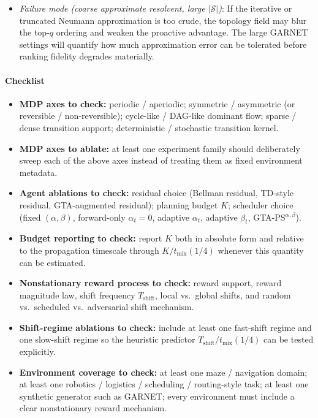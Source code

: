 \documentclass[10pt,a4paper]{article}
\begin{document}
\begin{itemize}
  \item \textit{Failure mode (coarse approximate resolvent, large $|\mathcal{S}|$)}: If the
    iterative or truncated Neumann approximation is too crude, the topology field may blur the
    top-$q$ ordering and weaken the proactive advantage. The large GARNET settings will quantify
    how much approximation error can be tolerated before ranking fidelity degrades materially.
\end{itemize}


\paragraph{Checklist}
\begin{itemize}\setlength\itemsep{2pt}
  \item \textbf{MDP axes to check:} periodic / aperiodic; symmetric / asymmetric (or reversible / non-reversible); cycle-like / DAG-like dominant flow; sparse / dense transition support; deterministic / stochastic transition kernel.

  \item \textbf{MDP axes to ablate:} at least one experiment family should deliberately sweep each of the above axes instead of treating them as fixed environment metadata.

  \item \textbf{Agent ablations to check:} residual choice (Bellman residual, TD-style residual, GTA-augmented residual); planning budget $K$; scheduler choice (fixed $(\alpha,\beta)$, forward-only $\alpha_t{=}0$, adaptive $\alpha_t$, adaptive $\beta_t$, GTA-PS$^{\alpha,\beta}$).

  \item \textbf{Budget reporting to check:} report $K$ both in absolute form and relative to the propagation timescale through $K/t_{\mathrm{mix}}(1/4)$ whenever this quantity can be estimated.

  \item \textbf{Nonstationary reward process to check:} reward support, reward magnitude law, shift frequency $T_{\mathrm{shift}}$, local vs.\ global shifts, and random vs.\ scheduled vs.\ adversarial shift mechanism.

  \item \textbf{Shift-regime ablations to check:} include at least one fast-shift regime and one slow-shift regime so the heuristic predictor $T_{\mathrm{shift}}/t_{\mathrm{mix}}(1/4)$ can be tested explicitly.

  \item \textbf{Environment coverage to check:} at least one maze / navigation domain; at least one robotics / logistics / scheduling / routing-style task; at least one synthetic generator such as GARNET; every environment must include a clear nonstationary reward mechanism.


\end{itemize}
\end{document}
